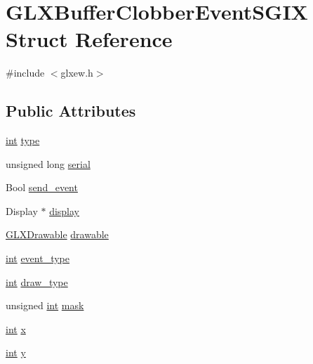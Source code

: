 \hypertarget{struct_g_l_x_buffer_clobber_event_s_g_i_x}{}\section{G\+L\+X\+Buffer\+Clobber\+Event\+S\+G\+I\+X Struct Reference}
\label{struct_g_l_x_buffer_clobber_event_s_g_i_x}


{\ttfamily \#include $<$glxew.\+h$>$}

\subsection*{Public Attributes}
\begin{DoxyCompactItemize}
\item 
\hyperlink{wglew_8h_a500a82aecba06f4550f6849b8099ca21}{int} \hyperlink{struct_g_l_x_buffer_clobber_event_s_g_i_x_a36e3e8a5feea664623ea43d0f273b63a}{type}
\item 
unsigned long \hyperlink{struct_g_l_x_buffer_clobber_event_s_g_i_x_ac295e3276a7986eeae4d6a2a28c7e0b7}{serial}
\item 
Bool \hyperlink{struct_g_l_x_buffer_clobber_event_s_g_i_x_af43bf0edbe40a74ef58dfb546a75118b}{send\+\_\+event}
\item 
Display $\ast$ \hyperlink{struct_g_l_x_buffer_clobber_event_s_g_i_x_afef060d81026da75c846727f4a3de9d4}{display}
\item 
\hyperlink{glxew_8h_a826f51745d9d6c81bdbac47ae2b80cf7}{G\+L\+X\+Drawable} \hyperlink{struct_g_l_x_buffer_clobber_event_s_g_i_x_a9c45674193ed80a79261c3b7518ee04f}{drawable}
\item 
\hyperlink{wglew_8h_a500a82aecba06f4550f6849b8099ca21}{int} \hyperlink{struct_g_l_x_buffer_clobber_event_s_g_i_x_a0b405123f1d6528f1f4dfa7ff92bde9b}{event\+\_\+type}
\item 
\hyperlink{wglew_8h_a500a82aecba06f4550f6849b8099ca21}{int} \hyperlink{struct_g_l_x_buffer_clobber_event_s_g_i_x_a25c31e8cbec0919f74a1e93ae74175b1}{draw\+\_\+type}
\item 
unsigned \hyperlink{wglew_8h_a500a82aecba06f4550f6849b8099ca21}{int} \hyperlink{struct_g_l_x_buffer_clobber_event_s_g_i_x_a74b4ad1ad3cac011001151411f621da1}{mask}
\item 
\hyperlink{wglew_8h_a500a82aecba06f4550f6849b8099ca21}{int} \hyperlink{struct_g_l_x_buffer_clobber_event_s_g_i_x_a5118d48c3c8d5253d39922b5014b52ff}{x}
\item 
\hyperlink{wglew_8h_a500a82aecba06f4550f6849b8099ca21}{int} \hyperlink{struct_g_l_x_buffer_clobber_event_s_g_i_x_aef21efa11558a5b67861f96471c56003}{y}

\end{DoxyCompactItemize}
